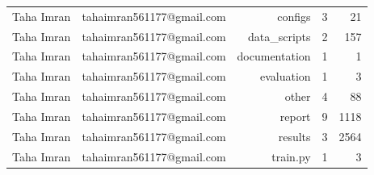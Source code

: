 \begin{table}[htbp]
\begin{tabular}{llrrr}
Taha Imran & tahaimran561177@gmail.com & configs & 3 & 21 \\
Taha Imran & tahaimran561177@gmail.com & data\_scripts & 2 & 157 \\
Taha Imran & tahaimran561177@gmail.com & documentation & 1 & 1 \\
Taha Imran & tahaimran561177@gmail.com & evaluation & 1 & 3 \\
Taha Imran & tahaimran561177@gmail.com & other & 4 & 88 \\
Taha Imran & tahaimran561177@gmail.com & report & 9 & 1118 \\
Taha Imran & tahaimran561177@gmail.com & results & 3 & 2564 \\
Taha Imran & tahaimran561177@gmail.com & train.py & 1 & 3 \\
\bottomrule
\end{tabular}
\end{table}
